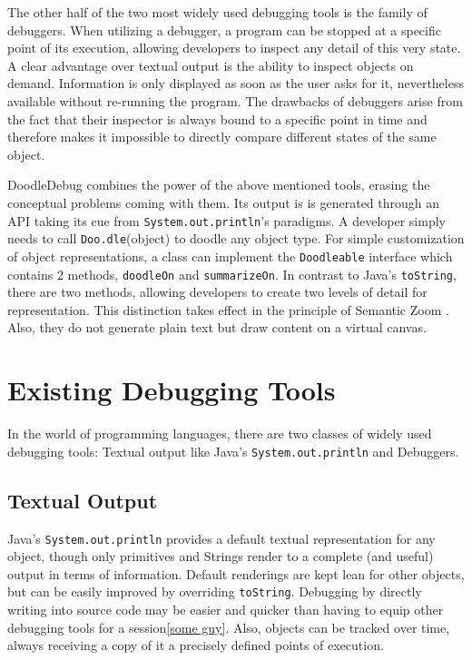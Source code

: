\documentclass[english]{scrartcl}
\newcommand{\DD}{Dood\-le\-De\-bug\xspace}
\newcommand{\Doodle}{\texttt{Doo.\-dle}\xspace}
\newcommand{\println}{\texttt{Sys\-tem.\-out.\-println}\xspace}
\begin{document}
The other half of the two most widely used debugging tools is the family of debuggers.
When utilizing a debugger, a program can be stopped at a specific point of its execution, allowing developers to inspect any detail of this very state.
A clear advantage over textual output is the ability to inspect objects on demand.
Information is only displayed as soon as the user asks for it, nevertheless available without re-running the program.
The drawbacks of debuggers arise from the fact that their inspector is always bound to a specific point in time and therefore makes it impossible to directly compare different states of the same object.

\DD combines the power of the above mentioned tools, erasing the conceptual problems coming with them.
Its output is is generated through an API taking its cue from \println's paradigms.
A developer simply needs to call \Doodle(object) to doodle any object type.
For simple customization of object representations, a class can implement the \texttt{Doodleable} interface which contains 2 methods, \texttt{doodleOn} and \texttt{summarizeOn}.
In contrast to Java's \texttt{toString}, there are two methods, allowing developers to create two levels of detail for representation.
This distinction takes effect in the principle of Semantic Zoom \cite{semantic-zoom}.
Also, they do not generate plain text but draw content on a virtual canvas.


\section{Existing Debugging Tools}
In the world of programming languages, there are two classes of widely used debugging tools:
Textual output like Java's \println and Debuggers.

\subsection{Textual Output}
Java's \println provides a default textual representation for any object, though only primitives and Strings render to a complete (and useful) output in terms of information.
Default renderings are kept lean for other objects, but can be easily improved by overriding \texttt{toString}.
Debugging by directly writing into source code may be easier and quicker than having to equip other debugging tools for a session\ref{some guy}.
Also, objects can be tracked over time, always receiving a copy of it a precisely defined points of execution.
\end{document}
